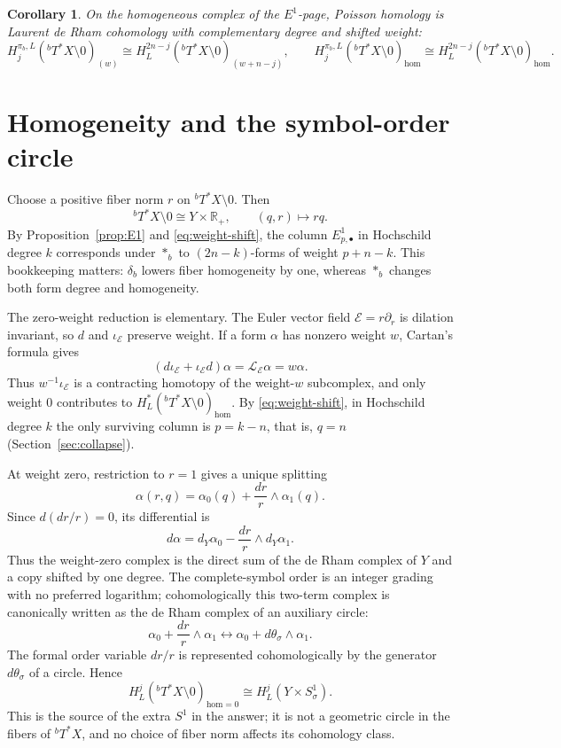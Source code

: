 \documentclass[11pt,oneside,reqno]{article}
\newcommand{\Tbstar}{{}^{b}T^*X}
\theoremstyle{plain}
\newtheorem{corollary}[theorem]{Corollary}
\theoremstyle{definition}
\theoremstyle{remark}
\begin{document}
\begin{corollary}\label{cor:poisson}
On the homogeneous complex of the \(E^1\)-page, Poisson homology is
Laurent de Rham cohomology with complementary degree and shifted weight:
\[
 H_j^{\pi_b,L}(\Tbstar\setminus0)_{(w)}
 \cong H_L^{2n-j}(\Tbstar\setminus0)_{(w+n-j)},
 \qquad
 H_j^{\pi_b,L}(\Tbstar\setminus0)_{\mathrm{hom}}
 \cong H_L^{2n-j}(\Tbstar\setminus0)_{\mathrm{hom}} .
\]
\end{corollary}

\section{Homogeneity and the symbol-order circle}\label{sec:homogeneity}

Choose a positive fiber norm \(r\) on \(\Tbstar\setminus0\). Then
\[
 \Tbstar\setminus0\cong Y\times\mathbb R_+,
 \qquad (q,r)\longmapsto rq.
\]
By Proposition~\ref{prop:E1} and \eqref{eq:weight-shift}, the column
\(E^1_{p,\bullet}\) in Hochschild degree \(k\) corresponds under \(*_b\) to
\((2n-k)\)-forms of weight \(p+n-k\). This bookkeeping matters:
\(\delta_b\) lowers fiber homogeneity by one, whereas \(*_b\) changes both
form degree and homogeneity.

The zero-weight reduction is elementary. The Euler vector field
\(\mathcal E=r\partial_r\) is dilation invariant, so \(d\) and
\(\iota_{\mathcal E}\) preserve weight. If a form \(\alpha\) has nonzero
weight \(w\), Cartan's formula gives
\[
 (d\iota_{\mathcal E}+\iota_{\mathcal E}d)\alpha
 =\mathcal L_{\mathcal E}\alpha=w\alpha.
\]
Thus \(w^{-1}\iota_{\mathcal E}\) is a contracting homotopy of the
weight-\(w\) subcomplex, and only weight \(0\) contributes to
\(H_L^*(\Tbstar\setminus0)_{\mathrm{hom}}\). By \eqref{eq:weight-shift}, in
Hochschild degree \(k\) the only surviving column is \(p=k-n\), that is,
\(q=n\) (Section~\ref{sec:collapse}).

At weight zero, restriction to \(r=1\) gives a unique splitting
\[
 \alpha(r,q)=\alpha_0(q)+\frac{dr}{r}\wedge\alpha_1(q).
\]
Since \(d(dr/r)=0\), its differential is
\[
 d\alpha=d_Y\alpha_0-\frac{dr}{r}\wedge d_Y\alpha_1.
\]
Thus the weight-zero complex is the direct sum of the de Rham complex of
\(Y\) and a copy shifted by one degree. The complete-symbol order is an
integer grading with no preferred logarithm; cohomologically this two-term
complex is canonically written as the de Rham complex of an auxiliary circle:
\[
 \alpha_0+\frac{dr}{r}\wedge\alpha_1
 \longleftrightarrow
 \alpha_0+d\theta_\sigma\wedge\alpha_1.
\]
The formal order variable \(dr/r\) is represented cohomologically by the
generator \(d\theta_\sigma\) of a circle. Hence
\begin{equation}\label{eq:order-circle}
 H_L^j(\Tbstar\setminus0)_{\mathrm{hom}=0}
 \cong H_L^j(Y\times S^1_\sigma).
\end{equation}
This is the source of the extra \(S^1\) in the answer; it is not a geometric
circle in the fibers of \(\Tbstar\), and no choice of fiber norm affects its
cohomology class.
\end{document}
